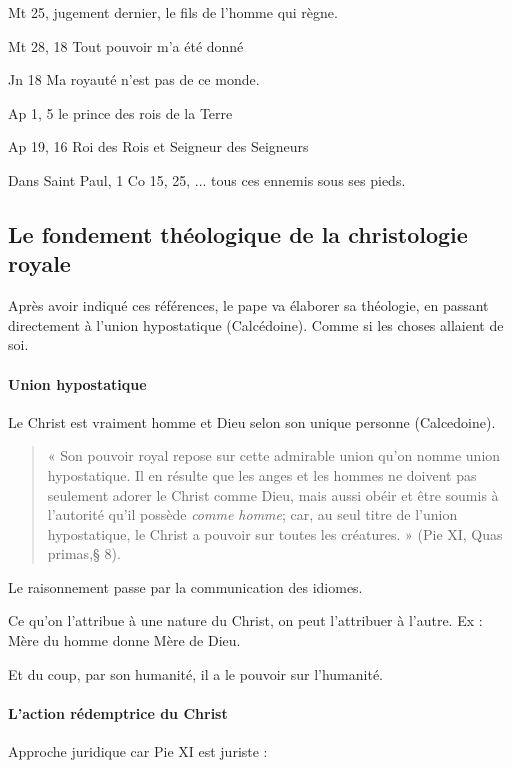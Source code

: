 Mt 25, jugement dernier, le fils de l'homme qui règne.

Mt 28, 18 Tout pouvoir m'a été donné

Jn 18 Ma royauté n'est pas de ce monde. 

Ap 1, 5 le prince des rois de la Terre

Ap 19, 16 Roi des Rois et Seigneur des Seigneurs

Dans Saint Paul, 1 Co 15, 25, ... tous ces ennemis sous ses pieds.




\subsection{Le fondement théologique de la christologie royale }

Après avoir indiqué ces références, le pape va élaborer sa théologie, en passant directement à l'union hypostatique (Calcédoine). Comme si les choses allaient de soi. 

\paragraph{Union hypostatique} 
\begin{Def}
Le Christ est vraiment homme et Dieu selon son unique personne (Calcedoine).
\end{Def}

\begin{quote}
    « Son pouvoir royal repose sur cette admirable union qu’on nomme union hypostatique. Il en résulte que les anges et les hommes ne doivent pas seulement adorer le Christ comme Dieu, mais aussi obéir et être soumis à l'autorité qu'il possède \textit{comme homme}; car, au seul titre de l'union hypostatique, le Christ a pouvoir sur toutes les créatures. » (Pie XI, Quas primas,§ 8). 
\end{quote}

Le raisonnement passe par la communication des idiomes.
\begin{Def}
Ce qu'on l'attribue à une nature du Christ, on peut l'attribuer à l'autre. Ex : Mère du homme donne Mère de Dieu.
\end{Def}

Et du coup, par son humanité, il a le pouvoir sur l'humanité.


\paragraph{L’action rédemptrice du Christ} Approche juridique car Pie XI est juriste : 

